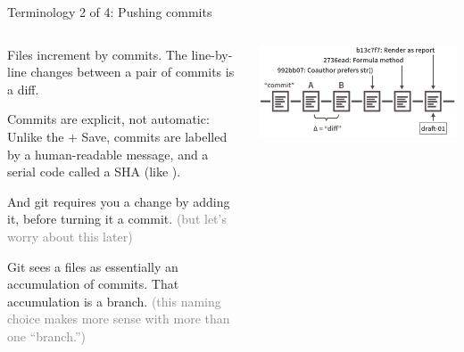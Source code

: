\documentclass[ignorenonframetext, 10pt, aspectratio=169]{beamer}
\begin{document}
\begin{frame}{Terminology 2 of 4: Pushing commits}
\begin{columns}[T]
\begin{column}{0.55\textwidth}
\begin{wideitemize}
\item<1-> Files increment by \alert{commit}s. The line-by-line changes between a pair of commits is a \alert{diff}.
\item<2-> Commits are explicit, not automatic: Unlike the  +  Save, commits are labelled by a human-readable \alert{message}, and a serial code called a \alert{SHA} (like ).
\item<2->And git requires you  a change by \alert{add}ing it, before turning it a commit. \textcolor{gray}{(but let's worry about this later)}
\item<3-> Git sees a files as essentially an accumulation of commits. That accumulation is a \alert{branch}. \textcolor{gray}{(this naming choice makes more sense with more than one ``branch.'')}
\end{wideitemize}
\end{column}
\begin{column}{0.45\textwidth}
\includegraphics[width = \linewidth]{commit-diff-sha-tag.png}
\end{column}
\end{columns}
\end{frame}
\end{document}
